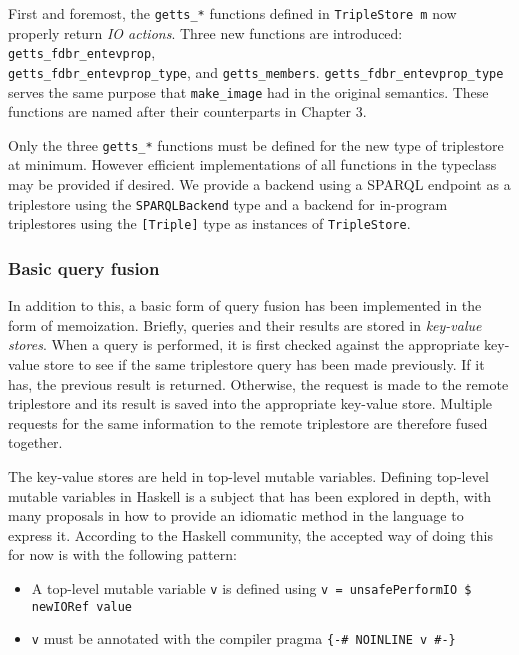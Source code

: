 \documentclass[../main.tex]{subfiles}
\begin{document}
First and foremost, the \texttt{getts\_*} functions defined in \texttt{TripleStore m} now properly return {\em IO actions}.
Three new functions are introduced: \texttt{getts\_fdbr\_entevprop},\\ \texttt{getts\_fdbr\_entevprop\_type}, and \texttt{getts\_members}.
\texttt{getts\_fdbr\_entevprop\_type} serves the same purpose that \texttt{make\_image} had in the original semantics.
These functions are named after their counterparts in Chapter 3.

Only the three \texttt{getts\_*} functions must be defined for the new type of triplestore at minimum. However efficient implementations
of all functions in the typeclass may be provided if desired.  We provide a backend using a SPARQL endpoint as a triplestore using the
\texttt{SPARQLBackend} type and a backend for in-program triplestores using the \texttt{[Triple]} type as instances of \texttt{TripleStore}.

\subsubsection{Basic query fusion}

In addition to this, a basic form of query fusion has been implemented in the form of memoization.  Briefly, queries and their results
are stored in {\em key-value stores}.  When a query is performed, it is first checked against the appropriate key-value store to see
if the same triplestore query has been made previously.  If it has, the previous result is returned.  Otherwise, the request is made to the remote
triplestore and its result is saved into the appropriate key-value store.  Multiple requests for the same information to the remote triplestore are therefore fused together.

The key-value stores are held in top-level mutable variables.  Defining top-level mutable variables in Haskell is a subject that has been explored in depth, with many proposals in how to provide an idiomatic method in the language to express it.  According to the Haskell community, the accepted way of doing this for now is with the following pattern\cite{tlmvconsensus}:

\begin{itemize}
	\item A top-level mutable variable \texttt{v} is defined using \texttt{v = unsafePerformIO \$ newIORef value} 
	\item \texttt{v} must be annotated with the compiler pragma \texttt{\{\--\# NOINLINE v \#\--\}}
\end{itemize}
\end{document}
